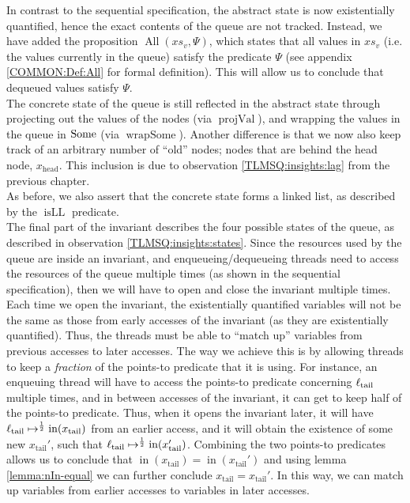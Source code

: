 \documentclass[a4paper, 10pt]{report}
\theoremstyle{definition}
\newcommand{\isLL}{\operatorname{isLL}}
\newcommand{\AllP}{\operatorname{All}}
\newcommand{\projval}{\operatorname{projVal}}
\newcommand{\wrapsome}{\operatorname{wrapSome}}
\newcommand{\locN}[1]{\loc_{\mathrm{#1}}}
\newcommand{\loctail}{\locN{tail}}
\newcommand{\nIn}[1]{\operatorname{in}(#1)}
\newcommand{\node}{x}
\newcommand{\nodeN}[1]{\node_{\mathrm{#1}}}
\newcommand{\nodehead}{\nodeN{head}}
\newcommand{\nodetail}{\nodeN{tail}}
\newcommand{\absvalueList}{xs_v}
\begin{document}
In contrast to the sequential specification, the abstract state is now existentially quantified, hence the exact contents of the queue are not tracked. Instead, we have added the proposition $\AllP(\absvalueList, \Psi)$, which states that all values in $\absvalueList$ (i.e. the values currently in the queue) satisfy the predicate $\Psi$ (see appendix \ref{COMMON:Def:All} for formal definition). This will allow us to conclude that dequeued values satisfy $\Psi$.\\
The concrete state of the queue is still reflected in the abstract state through projecting out the values of the nodes (via $\projval$), and wrapping the values in the queue in $\operatorname{Some}$ (via $\wrapsome$). Another difference is that we now also keep track of an arbitrary number of ``old'' nodes; nodes that are behind the head node, $\nodehead$. This inclusion is due to observation \ref{TLMSQ:insights:lag} from the previous chapter.\\
As before, we also assert that the concrete state forms a linked list, as described by the $\isLL$ predicate.\\
The final part of the invariant describes the four possible states of the queue, as described in observation \ref{TLMSQ:insights:states}. Since the resources used by the queue are inside an invariant, and enqueueing/dequeueing threads need to access the resources of the queue multiple times (as shown in the sequential specification), then we will have to open and close the invariant multiple times. Each time we open the invariant, the existentially quantified variables will not be the same as those from early accesses of the invariant (as they are existentially quantified). Thus, the threads must be able to ``match up'' variables from previous accesses to later accesses. The way we achieve this is by allowing threads to keep a \textit{fraction} of the points-to predicate that it is using. For instance, an enqueuing thread will have to access the points-to predicate concerning $\loctail$ multiple times, and in between accesses of the invariant, it can get to keep half of the points-to predicate. Thus, when it opens the invariant later, it will have $\loctail \mapsto^{\frac{1}{2}} \nIn{\nodetail}$ from an earlier access, and it will obtain the existence of some new $\nodetail'$, such that $\loctail \mapsto^{\frac{1}{2}} \nIn{\nodetail'}$. Combining the two points-to predicates allows us to conclude that $\nIn{\nodetail} = \nIn{\nodetail'}$ and using lemma \ref{lemma:nIn-equal} we can further conclude $\nodetail = \nodetail'$. In this way, we can match up variables from earlier accesses to variables in later accesses.\\
\end{document}
